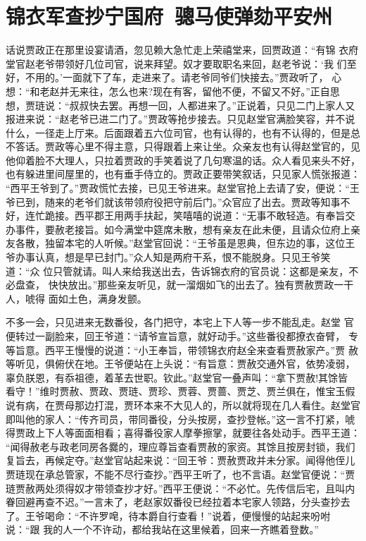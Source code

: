 \chapter{锦衣军查抄宁国府~骢马使弹劾平安州}

话说贾政正在那里设宴请酒，忽见赖大急忙走上荣禧堂来，回贾政道：“有锦
衣府堂官赵老爷带领好几位司官，说来拜望。奴才要取职名来回，赵老爷说：‘我
们至好，不用的。’一面就下了车，走进来了。请老爷同爷们快接去。”贾政听了，
心想：“和老赵并无来往，怎么也来?现在有客，留他不便，不留又不好。”正自思
想，贾琏说：“叔叔快去罢。再想一回，人都进来了。”正说着，只见二门上家人又
报进来说：“赵老爷已进二门了。”贾政等抢步接去。只见赵堂官满脸笑容，并不说
什么，一径走上厅来。后面跟着五六位司官，也有认得的，也有不认得的，但是总
不答话。贾政等心里不得主意，只得跟着上来让坐。众亲友也有认得赵堂官的，见
他仰着脸不大理人，只拉着贾政的手笑着说了几句寒温的话。众人看见来头不好，
也有躲进里间屋里的，也有垂手侍立的。贾政正要带笑叙话，只见家人慌张报道：
“西平王爷到了。”贾政慌忙去接，已见王爷进来。赵堂官抢上去请了安，便说：“王
爷已到，随来的老爷们就该带领府役把守前后门。”众官应了出去。贾政等知事不
好，连忙跪接。西平郡王用两手扶起，笑嘻嘻的说道：“无事不敢轻造。有奉旨交
办事件，要赦老接旨。如今满堂中筵席未散，想有亲友在此未便，且请众位府上亲
友各散，独留本宅的人听候。”赵堂官回说：“王爷虽是恩典，但东边的事，这位王
爷办事认真，想是早已封门。”众人知是两府干系，恨不能脱身。只见王爷笑道：“众
位只管就请。叫人来给我送出去，告诉锦衣府的官员说：这都是亲友，不必盘查，
快快放出。”那些亲友听见，就一溜烟如飞的出去了。独有贾赦贾政一干人，唬得
面如土色，满身发颤。

不多一会，只见进来无数番役，各门把守，本宅上下人等一步不能乱走。赵堂
官便转过一副脸来，回王爷道：“请爷宣旨意，就好动手。”这些番役都撩衣奋臂，
专等旨意。西平王慢慢的说道：“小王奉旨，带领锦衣府赵全来查看贾赦家产。”贾
赦等听见，俱俯伏在地。王爷便站在上头说：“有旨意：贾赦交通外官，依势凌弱，
辜负朕恩，有忝祖德，着革去世职。钦此。”赵堂官一叠声叫：“拿下贾赦!其馀皆
看守！”维时贾赦、贾政、贾琏、贾珍、贾蓉、贾蔷、贾芝、贾兰俱在，惟宝玉假
说有病，在贾母那边打混，贾环本来不大见人的，所以就将现在几人看住。赵堂官
即叫他的家人：“传齐司员，带同番役，分头按房，查抄登帐。”这一言不打紧，唬
得贾政上下人等面面相看；喜得番役家人摩拳擦掌，就要往各处动手。西平王道：
“闻得赦老与政老同房各爨的，理应尊旨查看贾赦的家资。其馀且按房封锁，我们
复旨去，再候定夺。”赵堂官站起来说：“回王爷：贾赦贾政并未分家。闻得他侄儿
贾琏现在承总管家，不能不尽行查抄。”西平王听了，也不言语。赵堂官便说：“贾
琏贾赦两处须得奴才带领查抄才好。”西平王便说：“不必忙。先传信后宅，且叫内
眷回避再查不迟。”一言未了，老赵家奴番役已经拉着本宅家人领路，分头查抄去
了。王爷喝命：“不许罗唣，待本爵自行查看！”说着，便慢慢的站起来吩咐说：“跟
我的人一个不许动，都给我站在这里候着，回来一齐瞧着登数。”

